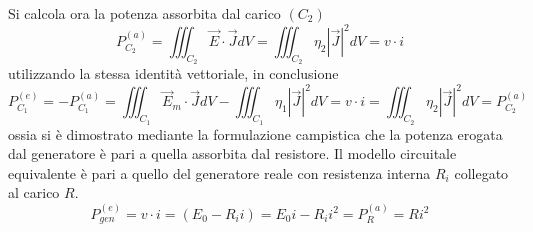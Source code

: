 Si calcola ora la potenza assorbita dal carico $(C_2)$
$$
P_{C_2}^{(a)} = \iiint_{C_2} \vec{E}\cdot\vec{J} dV = \iiint_{C_2} \eta_2 |\vec{J}|^2 dV = v\cdot i
$$
utilizzando la stessa identità vettoriale, in conclusione
$$
P_{C_1}^{(e)} = -P_{C_1}^{(a)} =  \iiint_{C_1} \vec{E}_m\cdot\vec{J}dV - \iiint_{C_1} \eta_1 |\vec{J}|^2dV = v\cdot i = \iiint_{C_2} \eta_2 |\vec{J}|^2 dV = P_{C_2}^{(a)}
$$
ossia si è dimostrato mediante la formulazione campistica che la potenza erogata
dal generatore è pari a quella assorbita dal resistore.
Il modello circuitale equivalente è pari a quello del generatore reale con resistenza
interna $R_i$ collegato al carico $R$.
$$
P_{gen}^{(e)} = v\cdot i = (E_0 -R_i i ) = E_0 i - R_i i^2 = P_R^{(a)} = Ri^2
$$
